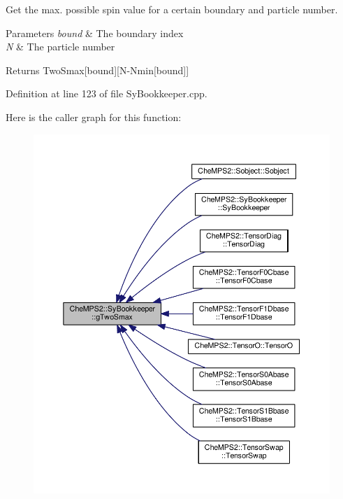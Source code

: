 Get the max. possible spin value for a certain boundary and particle number. 


\begin{DoxyParams}{Parameters}
{\em bound} & The boundary index \\
\hline
{\em N} & The particle number \\
\hline
\end{DoxyParams}
\begin{DoxyReturn}{Returns}
Two\-Smax\mbox{[}bound\mbox{]}\mbox{[}N-\/\-Nmin\mbox{[}bound\mbox{]}\mbox{]} 
\end{DoxyReturn}


Definition at line 123 of file Sy\-Bookkeeper.\-cpp.



Here is the caller graph for this function\-:\nopagebreak
\begin{figure}[H]
\begin{center}
\leavevmode
\includegraphics[width=350pt]{classCheMPS2_1_1SyBookkeeper_a5203e4ac44a9c369974d9f817f634ddb_icgraph}
\end{center}
\end{figure}


